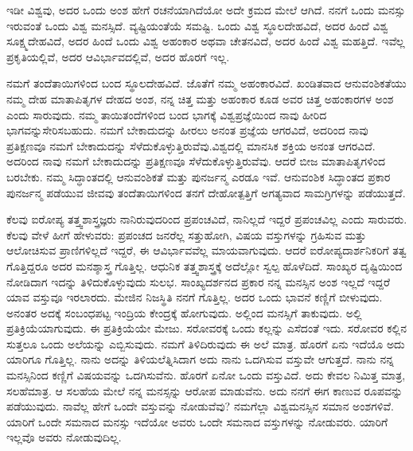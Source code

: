 \vskip 6pt

ಇಡೀ ವಿಶ್ವವು, ಅದರ ಒಂದು ಅಂಶ ಹೇಗೆ ರಚನೆಯಾಗಿದೆಯೋ ಅದೇ ಕ್ರಮದ ಮೇಲೆ ಆಗಿದೆ. ನನಗೆ ಒಂದು ಮನಸ್ಸು ಇರುವಂತೆ ಒಂದು ವಿಶ್ವ ಮನಸ್ಸಿದೆ. ವ್ಯಷ್ಟಿಯಂತೆಯೆ ಸಮಷ್ಟಿ. ಒಂದು ವಿಶ್ವ ಸ್ಥೂಲದೇಹವಿದೆ, ಅದರ ಹಿಂದೆ ವಿಶ್ವ ಸೂಕ್ಷ್ಮದೇಹವಿದೆ, ಅದರ ಹಿಂದೆ ಒಂದು ವಿಶ್ವ ಅಹಂಕಾರ ಅಥವಾ ಚೇತನವಿದೆ, ಅದರ ಹಿಂದೆ ವಿಶ್ವ ಮಹತ್ತಿದೆ. ಇವೆಲ್ಲ ಪ್ರಕೃತಿಯಲ್ಲಿವೆ, ಅದರ ಆವಿರ್ಭಾವದಲ್ಲಿವೆ, ಅದರ ಹೊರಗೆ ಇಲ್ಲ.

\vskip 6pt

ನಮಗೆ ತಂದೆತಾಯಿಗಳಿಂದ ಬಂದ ಸ್ಥೂಲದೇಹವಿದೆ. ಜೊತೆಗೆ ನಮ್ಮ ಅಹಂಕಾರವಿದೆ. ಖಂಡಿತವಾದ ಆನುವಂಶಿಕತೆಯು ನಮ್ಮ ದೇಹ ಮಾತಾಪಿತೃಗಳ ದೇಹದ ಅಂಶ, ನನ್ನ ಚಿತ್ತ ಮತ್ತು ಅಹಂಕಾರ ಕೂಡ ಅವರ ಚಿತ್ತ ಅಹಂಕಾರಗಳ ಅಂಶ ಎಂದು ಸಾರುವುದು. ನಮ್ಮ ತಾಯಿತಂದೆಗಳಿಂದ ಬಂದ ಭಾಗಕ್ಕೆ ವಿಶ್ವಪ್ರಜ್ಞೆಯಿಂದ ನಾವು ಹೀರಿದ ಭಾಗವನ್ನು\break ಸೇರಿಸಬಹುದು. ನಮಗೆ ಬೇಕಾದುದನ್ನು ಹೀರಲು ಅನಂತ ಪ್ರಜ್ಞೆಯ ಆಗರವಿದೆ, ಅದರಿಂದ ನಾವು ಪ್ರತಿಕ್ಷಣವೂ ನಮಗೆ ಬೇಕಾದುದನ್ನು ಸೆಳೆದುಕೊಳ್ಳುತ್ತಿರುವೆವು.\break ವಿಶ್ವದಲ್ಲಿ ಮಾನಸಿಕ ಶಕ್ತಿಯ ಅನಂತ ಆಗರವಿದೆ. ಅದರಿಂದ ನಾವು ನಮಗೆ ಬೇಕಾದುದನ್ನು ಪ್ರತಿಕ್ಷಣವೂ ಸೆಳೆದುಕೊಳ್ಳುತ್ತಿರುವೆವು. ಆದರೆ ಬೀಜ ಮಾತಾಪಿತೃಗಳಿಂದ ಬರಬೇಕು. ನಮ್ಮ ಸಿದ್ಧಾಂತದಲ್ಲಿ ಆನುವಂಶಿಕತೆ ಮತ್ತು ಪುನರ್ಜನ್ಮ ಎರಡೂ ಇವೆ. ಆನುವಂಶಿಕ ಸಿದ್ಧಾಂತದ ಪ್ರಕಾರ ಪುನರ್ಜನ್ಮ ಪಡೆಯುವ ಜೀವವು ತಂದೆತಾಯಿಗಳಿಂದ ತನಗೆ ದೇಹೋತ್ಪತ್ತಿಗೆ ಅಗತ್ಯವಾದ ಸಾಮಗ್ರಿಗಳನ್ನು ಪಡೆಯುತ್ತದೆ.

\vskip 6pt

ಕೆಲವು ಐರೋಪ್ಯ ತತ್ತ್ವಶಾಸ್ತ್ರಜ್ಞರು ನಾನಿರುವುದರಿಂದ ಪ್ರಪಂಚವಿದೆ, ನಾನಿಲ್ಲದೆ ಇದ್ದರೆ ಪ್ರಪಂಚವಿಲ್ಲ ಎಂದು ಸಾರುವರು. ಕೆಲವು ವೇಳೆ ಹೀಗೆ ಹೇಳುವರು: ಪ್ರಪಂಚದ ಜನರೆಲ್ಲ ಸತ್ತುಹೋಗಿ, ವಿಷಯ ವಸ್ತುಗಳನ್ನು ಗ್ರಹಿಸುವ ಮತ್ತು ಆಲೋಚಿಸುವ ಪ್ರಾಣಿಗಳಿಲ್ಲದೆ ಇದ್ದರೆ, ಈ ಆವಿರ್ಭಾವವೆಲ್ಲ ಮಾಯವಾಗುವುದು. ಆದರೆ ಐರೋಪ್ಯ\break ದಾರ್ಶನಿಕರಿಗೆ ತತ್ವ ಗೊತ್ತಿದ್ದರೂ ಅದರ ಮನಶ್ಶಾಸ್ತ್ರ ಗೊತ್ತಿಲ್ಲ. ಆಧುನಿಕ ತತ್ತ್ವಶಾಸ್ತ್ರಕ್ಕೆ ಅದೆಲ್ಲೋ ಸ್ವಲ್ಪ ಹೊಳೆದಿದೆ. ಸಾಂಖ್ಯರ ದೃಷ್ಟಿಯಿಂದ ನೋಡಿದಾಗ ಇದನ್ನು ತಿಳಿದುಕೊಳ್ಳುವುದು ಸುಲಭ. ಸಾಂಖ್ಯದರ್ಶನದ ಪ್ರಕಾರ ನನ್ನ ಮನಸ್ಸಿನ ಅಂಶ ಇಲ್ಲದೆ ಇದ್ದರೆ ಯಾವ ವಸ್ತುವೂ ಇರಲಾರದು. ಮೇಜಿನ ನಿಜಸ್ಥಿತಿ ನನಗೆ ಗೊತ್ತಿಲ್ಲ. ಅದರ ಒಂದು ಭಾವನೆ ಕಣ್ಣಿಗೆ ಬೀಳುವುದು. ಅನಂತರ ಅದಕ್ಕೆ ಸಂಬಂಧಪಟ್ಟ ಇಂದ್ರಿಯ ಕೇಂದ್ರಕ್ಕೆ ಹೋಗುವುದು. ಅಲ್ಲಿಂದ ಮನಸ್ಸಿಗೆ ತಾಕುವುದು. ಅಲ್ಲಿ ಪ್ರತಿಕ್ರಿಯೆಯಾಗುವುದು. ಈ ಪ್ರತಿಕ್ರಿಯೆಯೇ ಮೇಜು. ಸರೋವರಕ್ಕೆ ಒಂದು ಕಲ್ಲನ್ನು ಎಸೆದಂತೆ ಇದು. ಸರೋವರ ಕಲ್ಲಿನ ಸುತ್ತಲೂ ಒಂದು ಅಲೆಯನ್ನು ಎಬ್ಬಿಸುವುದು. ನಮಗೆ ತಿಳಿದಿರುವುದು ಈ ಅಲೆ ಮಾತ್ರ. ಹೊರಗೆ ಏನು ಇದೆಯೊ ಅದು ಯಾರಿಗೂ ಗೊತ್ತಿಲ್ಲ. ನಾನು ಅದನ್ನು ತಿಳಿಯಲೆತ್ನಿಸಿದಾಗ ಅದು ನಾನು ಒದಗಿಸುವ ವಸ್ತುವೇ ಆಗುತ್ತದೆ. ನಾನು ನನ್ನ ಮನಸ್ಸಿನಿಂದ ಕಣ್ಣಿಗೆ ವಿಷಯವನ್ನು ಒದಗಿಸುವೆನು. ಹೊರಗೆ ಏನೋ ಒಂದು ವಸ್ತುವಿದೆ. ಅದು ಕೇವಲ ನಿಮಿತ್ತ ಮಾತ್ರ, ಸಲಹೆಮಾತ್ರ. ಆ ಸಲಹೆಯ ಮೇಲೆ ನನ್ನ ಮನಸ್ಸನ್ನು ಆರೋಪ ಮಾಡುವೆನು. ಅದು ನನಗೆ ಈಗ ಕಾಣುವ ರೂಪವನ್ನು ಪಡೆಯುವುದು. ನಾವೆಲ್ಲ ಹೇಗೆ ಒಂದೇ ವಸ್ತುವನ್ನು ನೋಡುವೆವು? ನಮಗೆಲ್ಲಾ ವಿಶ್ವಮನಸ್ಸಿನ ಸಮಾನ ಅಂಶಗಳಿವೆ. ಯಾರಿಗೆ ಒಂದೇ ಸಮನಾದ ಮನಸ್ಸು ಇದೆಯೋ ಅವರು ಒಂದೇ ಸಮನಾದ ವಸ್ತುಗಳನ್ನು ನೋಡುವರು. ಯಾರಿಗೆ ಇಲ್ಲವೊ ಅವರು ನೋಡುವುದಿಲ್ಲ.

